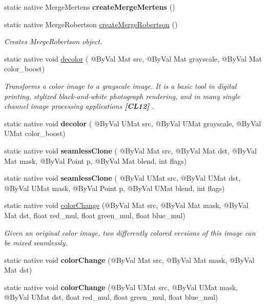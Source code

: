 \begin{DoxyCompactItemize}
static native Merge\+Mertens {\bfseries create\+Merge\+Mertens} ()
\item 
static native Merge\+Robertson \hyperlink{group__photo__hdr_ga658fdc1c45f60d70951e9364b7a974ae}{create\+Merge\+Robertson} ()
\begin{DoxyCompactList}\small\item\em Creates Merge\+Robertson object. \end{DoxyCompactList}\item 
static native void \hyperlink{group__photo_ga51c7b45dade866b4280660a0a0842dbc}{decolor} ( @By\+Val Mat src, @By\+Val Mat grayscale, @By\+Val Mat color\+\_\+boost)
\begin{DoxyCompactList}\small\item\em Transforms a color image to a grayscale image. It is a basic tool in digital printing, stylized black-\/and-\/white photograph rendering, and in many single channel image processing applications {\bfseries [C\+L12]} . \end{DoxyCompactList}\item 
static native void {\bfseries decolor} ( @By\+Val U\+Mat src, @By\+Val U\+Mat grayscale, @By\+Val U\+Mat color\+\_\+boost)
\item 
static native void {\bfseries seamless\+Clone} ( @By\+Val Mat src, @By\+Val Mat dst, @By\+Val Mat mask, @By\+Val Point p, @By\+Val Mat blend, int flags)
\item 
static native void {\bfseries seamless\+Clone} ( @By\+Val U\+Mat src, @By\+Val U\+Mat dst, @By\+Val U\+Mat mask, @By\+Val Point p, @By\+Val U\+Mat blend, int flags)
\item 
static native void \hyperlink{group__photo__clone_ga3560d162cd540795fe14ae7e98a7a9a2}{color\+Change} (@By\+Val Mat src, @By\+Val Mat mask, @By\+Val Mat dst, float red\+\_\+mul, float green\+\_\+mul, float blue\+\_\+mul)
\begin{DoxyCompactList}\small\item\em Given an original color image, two differently colored versions of this image can be mixed seamlessly. \end{DoxyCompactList}\item 
static native void {\bfseries color\+Change} (@By\+Val Mat src, @By\+Val Mat mask, @By\+Val Mat dst)
\item 
static native void {\bfseries color\+Change} (@By\+Val U\+Mat src, @By\+Val U\+Mat mask, @By\+Val U\+Mat dst, float red\+\_\+mul, float green\+\_\+mul, float blue\+\_\+mul)
\item 

\end{DoxyCompactItemize}
